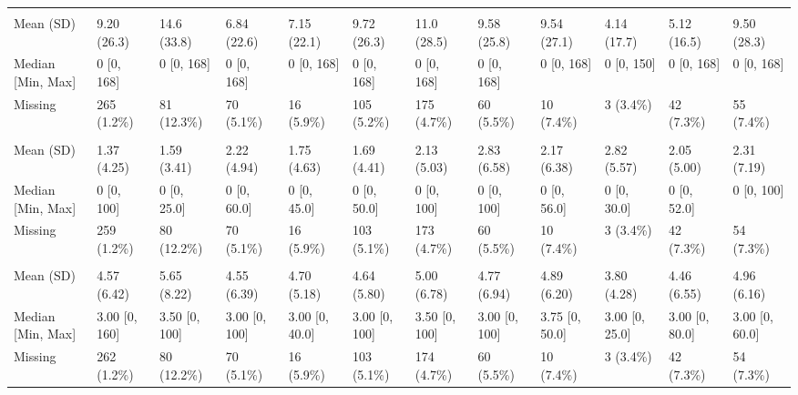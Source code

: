 \documentclass[
  single column]{article}
\begin{document}
\begin{landscape}
\begin{longtable}[t]{llllllllllll}
\addlinespace[0.3em]
\multicolumn{12}{l}{\textbf{Hours Spent with Children per Week}}\\
\hspace{1em}Mean (SD) & 9.20 (26.3) & 14.6 (33.8) & 6.84 (22.6) & 7.15 (22.1) & 9.72 (26.3) & 11.0 (28.5) & 9.58 (25.8) & 9.54 (27.1) & 4.14 (17.7) & 5.12 (16.5) & 9.50 (28.3)\\
\hspace{1em}Median [Min, Max] & 0 [0, 168] & 0 [0, 168] & 0 [0, 168] & 0 [0, 168] & 0 [0, 168] & 0 [0, 168] & 0 [0, 168] & 0 [0, 168] & 0 [0, 150] & 0 [0, 168] & 0 [0, 168]\\
\hspace{1em}Missing & 265 (1.2\%) & 81 (12.3\%) & 70 (5.1\%) & 16 (5.9\%) & 105 (5.2\%) & 175 (4.7\%) & 60 (5.5\%) & 10 (7.4\%) & 3 (3.4\%) & 42 (7.3\%) & 55 (7.4\%)\\
\addlinespace[0.3em]
\multicolumn{12}{l}{\textbf{Hours Spent on Charity per Week}}\\
\hspace{1em}Mean (SD) & 1.37 (4.25) & 1.59 (3.41) & 2.22 (4.94) & 1.75 (4.63) & 1.69 (4.41) & 2.13 (5.03) & 2.83 (6.58) & 2.17 (6.38) & 2.82 (5.57) & 2.05 (5.00) & 2.31 (7.19)\\
\hspace{1em}Median [Min, Max] & 0 [0, 100] & 0 [0, 25.0] & 0 [0, 60.0] & 0 [0, 45.0] & 0 [0, 50.0] & 0 [0, 100] & 0 [0, 100] & 0 [0, 56.0] & 0 [0, 30.0] & 0 [0, 52.0] & 0 [0, 100]\\
\hspace{1em}Missing & 259 (1.2\%) & 80 (12.2\%) & 70 (5.1\%) & 16 (5.9\%) & 103 (5.1\%) & 173 (4.7\%) & 60 (5.5\%) & 10 (7.4\%) & 3 (3.4\%) & 42 (7.3\%) & 54 (7.3\%)\\
\addlinespace[0.3em]
\multicolumn{12}{l}{\textbf{Commute Hours per Week}}\\
\hspace{1em}Mean (SD) & 4.57 (6.42) & 5.65 (8.22) & 4.55 (6.39) & 4.70 (5.18) & 4.64 (5.80) & 5.00 (6.78) & 4.77 (6.94) & 4.89 (6.20) & 3.80 (4.28) & 4.46 (6.55) & 4.96 (6.16)\\
\hspace{1em}Median [Min, Max] & 3.00 [0, 160] & 3.50 [0, 100] & 3.00 [0, 100] & 3.00 [0, 40.0] & 3.00 [0, 100] & 3.50 [0, 100] & 3.00 [0, 100] & 3.75 [0, 50.0] & 3.00 [0, 25.0] & 3.00 [0, 80.0] & 3.00 [0, 60.0]\\
\hspace{1em}Missing & 262 (1.2\%) & 80 (12.2\%) & 70 (5.1\%) & 16 (5.9\%) & 103 (5.1\%) & 174 (4.7\%) & 60 (5.5\%) & 10 (7.4\%) & 3 (3.4\%) & 42 (7.3\%) & 54 (7.3\%)\\

\end{longtable}
\end{landscape}
\end{document}
